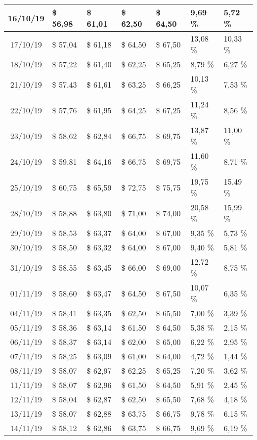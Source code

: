 \begin{center}
\begin{longtable}{|c|p{1.5cm}|p{1.5cm}|p{1.5cm}|p{1.5cm}|p{1.5cm}|p{1.5cm}|}
16/10/19 & \$ 56,98 & \$ 61,01 & \$ 62,50 & \$ 64,50 & 9,69 \% & 5,72 \% \\ \hline
17/10/19 & \$ 57,04 & \$ 61,18 & \$ 64,50 & \$ 67,50 & 13,08 \% & 10,33 \% \\ \hline
18/10/19 & \$ 57,22 & \$ 61,40 & \$ 62,25 & \$ 65,25 & 8,79 \% & 6,27 \% \\ \hline
21/10/19 & \$ 57,43 & \$ 61,61 & \$ 63,25 & \$ 66,25 & 10,13 \% & 7,53 \% \\ \hline
22/10/19 & \$ 57,76 & \$ 61,95 & \$ 64,25 & \$ 67,25 & 11,24 \% & 8,56 \% \\ \hline
23/10/19 & \$ 58,62 & \$ 62,84 & \$ 66,75 & \$ 69,75 & 13,87 \% & 11,00 \% \\ \hline
24/10/19 & \$ 59,81 & \$ 64,16 & \$ 66,75 & \$ 69,75 & 11,60 \% & 8,71 \% \\ \hline
25/10/19 & \$ 60,75 & \$ 65,59 & \$ 72,75 & \$ 75,75 & 19,75 \% & 15,49 \% \\ \hline
28/10/19 & \$ 58,88 & \$ 63,80 & \$ 71,00 & \$ 74,00 & 20,58 \% & 15,99 \% \\ \hline
29/10/19 & \$ 58,53 & \$ 63,37 & \$ 64,00 & \$ 67,00 & 9,35 \% & 5,73 \% \\ \hline
30/10/19 & \$ 58,50 & \$ 63,32 & \$ 64,00 & \$ 67,00 & 9,40 \% & 5,81 \% \\ \hline
31/10/19 & \$ 58,55 & \$ 63,45 & \$ 66,00 & \$ 69,00 & 12,72 \% & 8,75 \% \\ \hline
01/11/19 & \$ 58,60 & \$ 63,47 & \$ 64,50 & \$ 67,50 & 10,07 \% & 6,35 \% \\ \hline
04/11/19 & \$ 58,41 & \$ 63,35 & \$ 62,50 & \$ 65,50 & 7,00 \% & 3,39 \% \\ \hline
05/11/19 & \$ 58,36 & \$ 63,14 & \$ 61,50 & \$ 64,50 & 5,38 \% & 2,15 \% \\ \hline
06/11/19 & \$ 58,37 & \$ 63,14 & \$ 62,00 & \$ 65,00 & 6,22 \% & 2,95 \% \\ \hline
07/11/19 & \$ 58,25 & \$ 63,09 & \$ 61,00 & \$ 64,00 & 4,72 \% & 1,44 \% \\ \hline
08/11/19 & \$ 58,07 & \$ 62,97 & \$ 62,25 & \$ 65,25 & 7,20 \% & 3,62 \% \\ \hline
11/11/19 & \$ 58,07 & \$ 62,96 & \$ 61,50 & \$ 64,50 & 5,91 \% & 2,45 \% \\ \hline
12/11/19 & \$ 58,04 & \$ 62,87 & \$ 62,50 & \$ 65,50 & 7,68 \% & 4,18 \% \\ \hline
13/11/19 & \$ 58,07 & \$ 62,88 & \$ 63,75 & \$ 66,75 & 9,78 \% & 6,15 \% \\ \hline
14/11/19 & \$ 58,12 & \$ 62,86 & \$ 63,75 & \$ 66,75 & 9,69 \% & 6,19 \% \\ \hline

\end{longtable}
\end{center}
